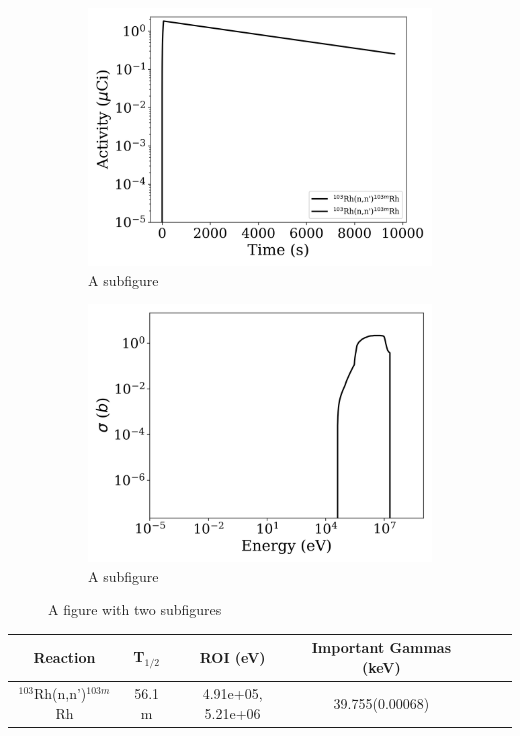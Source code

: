 \begin{figure}[h]
\centering
\begin{subfigure}{.5\textwidth}
  \centering
     \includegraphics[width=.8\textwidth]{plot/Rh-103(n,n')Rh-103m_wisconsin1} 

  \caption{A subfigure}
  \label{fig:sub1}
\end{subfigure}%
\begin{subfigure}{.5\textwidth}
  \centering
     \includegraphics[width=.8\textwidth]{plot/Rh-103(n,n')Rh-103m} 

  \caption{A subfigure}
  \label{fig:sub2}
\end{subfigure}
\caption{A figure with two subfigures}
\label{fig:test}
\end{figure}

\begin{table}[h]
\centering
\begin{tabular}{ |c|c|c|c|c|c|c| }
 \hline
 Reaction & T$_{1/2}$ & ROI (eV) & Important Gammas (keV) \\
 \hline 
 $^{103}$Rh(n,n')$^{103m}$Rh & 56.1 m & 4.91e+05, 5.21e+06 & 39.755(0.00068) \\ 
\hline
\end{tabular}
\end{table}
